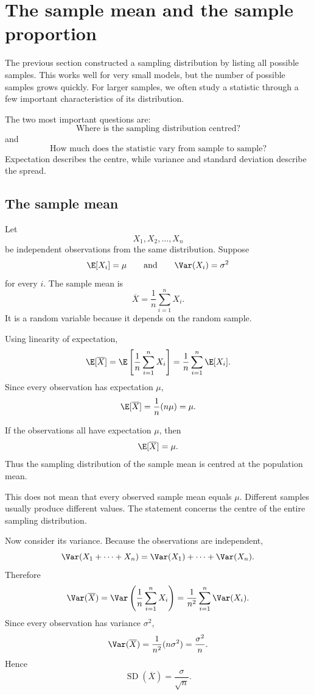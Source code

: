 \section{The sample mean and the sample proportion}

The previous section constructed a sampling distribution by listing all possible
samples. This works well for very small models, but the number of possible samples
grows quickly. For larger samples, we often study a statistic through a few
important characteristics of its distribution.

The two most important questions are:
\[
\text{Where is the sampling distribution centred?}
\]
and
\[
\text{How much does the statistic vary from sample to sample?}
\]
Expectation describes the centre, while variance and standard deviation describe
the spread.

\subsection*{The sample mean}

Let
\[
X_1,X_2,\ldots,X_n
\]
be independent observations from the same distribution. Suppose
\[
\E[X_i]=\mu
\qquad\text{and}\qquad
\Var(X_i)=\sigma^2
\]
for every \(i\). The sample mean is
\[
\overline X=\frac1n\sum_{i=1}^n X_i.
\]
It is a random variable because it depends on the random sample.

Using linearity of expectation,
\[
\E[\overline X]
=
\E\left[\frac1n\sum_{i=1}^n X_i\right]
=
\frac1n\sum_{i=1}^n\E[X_i].
\]
Since every observation has expectation \(\mu\),
\[
\E[\overline X]
=
\frac1n(n\mu)
=
\mu.
\]

\begin{theorembox}
If the observations all have expectation \(\mu\), then
\[
\E[\overline X]=\mu.
\]
Thus the sampling distribution of the sample mean is centred at the population
mean.
\end{theorembox}

This does not mean that every observed sample mean equals \(\mu\). Different
samples usually produce different values. The statement concerns the centre of
the entire sampling distribution.

Now consider its variance. Because the observations are independent,
\[
\Var(X_1+\cdots+X_n)
=
\Var(X_1)+\cdots+\Var(X_n).
\]
Therefore
\[
\Var(\overline X)
=
\Var\left(\frac1n\sum_{i=1}^nX_i\right)
=
\frac1{n^2}\sum_{i=1}^n\Var(X_i).
\]
Since every observation has variance \(\sigma^2\),
\[
\Var(\overline X)
=
\frac1{n^2}(n\sigma^2)
=
\frac{\sigma^2}{n}.
\]
Hence
\[
\operatorname{SD}(\overline X)
=
\frac{\sigma}{\sqrt n}.
\]


